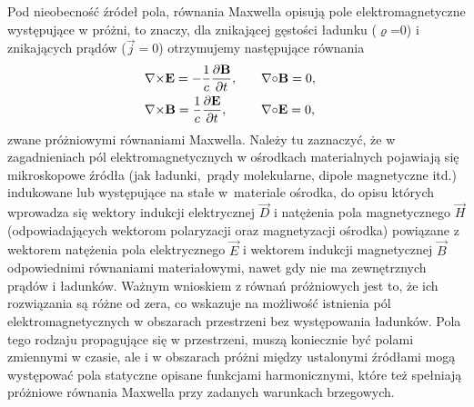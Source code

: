 

\indent Pod nieobecność źródeł pola, równania Maxwella opisują pole elektromagnetyczne występujące w próżni, to znaczy, dla znikającej gęstości ładunku ($\varrho$=0) i znikających prądów ($\vec{j}=0$) otrzymujemy następujące równania
\begin{equation}
\begin{aligned}
&{\bf \nabla}{\times}{\bf E}=-\frac{1}{c}\frac{\partial {\bf B}}{\partial t},&\quad   &{\bf \nabla}{\circ}{\bf {\bf B}}=0,&\\
&{\bf \nabla}{\times}{\bf B}=\frac{1}{c}\frac{\partial {\bf E}}{\partial t},&\quad &{\bf \nabla}{\circ}{\bf {\bf E}}=0,&
\end{aligned}
\end{equation}
zwane próżniowymi równaniami Maxwella. Należy tu zaznaczyć, że w zagadnieniach pól e\-le\-ktro\-ma\-gne\-ty\-cznych w ośrodkach materialnych pojawiają się mikroskopowe źródła (jak ładunki,~prądy molekularne, dipole magnetyczne itd.) indukowane lub występujące na stałe w~materiale ośrodka, do opisu których wprowadza się wektory indukcji elektrycznej $\vec{D}$  i natężenia pola magnetycznego $\vec{H}$ (odpowiadających  wektorom polaryzacji oraz magnetyzacji ośrodka) powiązane z wektorem natężenia pola elektrycznego $\vec{E}$ i wektorem indukcji magnetycznej $\vec{B}$ od\-po\-wie\-dni\-mi równaniami materiałowymi, nawet gdy nie ma zewnętrznych prądów i ładunków. Ważnym wnioskiem z równań próżniowych jest to, że ich  
rozwiązania są różne od zera, co wskazuje na możliwość istnienia pól elektromagnetycznych w obszarach przestrzeni bez występowania ładunków. Pola tego rodzaju propagujące się w przestrzeni, muszą koniecznie być polami zmiennymi w czasie, ale i w obszarach próżni między ustalonymi źródłami mogą występować pola statyczne opisane funkcjami harmonicznymi, które też spełniają próżniowe równania Maxwella przy zadanych warunkach brzegowych.

